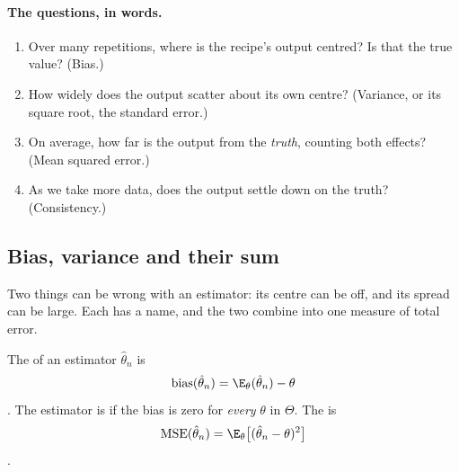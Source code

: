 \paragraph{The questions, in words.}
\begin{enumerate}[label=\arabic*.]
  \item Over many repetitions, where is the recipe's output centred? Is that
        the true value? (Bias.)
  \item How widely does the output scatter about its own centre? (Variance,
        or its square root, the standard error.)
  \item On average, how far is the output from the \emph{truth}, counting
        both effects? (Mean squared error.)
  \item As we take more data, does the output settle down on the truth?
        (Consistency.)
\end{enumerate}

\subsection{Bias, variance and their sum}
\label{3a:sec:mse}

Two things can be wrong with an estimator: its centre can be off, and its
spread can be large. Each has a name, and the two combine into one measure of
total error.

\begin{workdef}
The  of an estimator $\hat\theta_n$ is
\begin{equation}
  \operatorname{bias}(\hat\theta_n)=\E_\theta(\hat\theta_n)-\theta
  \label{3a:eq:bias}
\end{equation}
. The estimator is  if the
bias is zero for \emph{every} $\theta$ in $\Theta$. The  is
\begin{equation}
  \operatorname{MSE}(\hat\theta_n)=\E_\theta\bigl[(\hat\theta_n-\theta)^2\bigr]
  \label{3a:eq:mse-def}
\end{equation}
.
\end{workdef}

